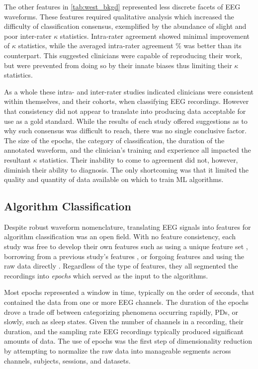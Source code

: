 The other features in \cref{tab:west_bkgd} represented less discrete facets of \ac{EEG} waveforms. These features required qualitative analysis which increased the difficulty of classification consensus, exemplified by the abundance of slight and poor inter-rater $\kappa$ statistics. Intra-rater agreement showed minimal improvement of $\kappa$ statistics, while the averaged intra-rater agreement \% was better than its counterpart. This suggested clinicians were capable of reproducing their work, but were prevented from doing so by their innate biases thus limiting their $\kappa$ statistics. 

As a whole these intra- and inter-rater studies indicated clinicians were consistent within themselves, and their cohorts, when classifying \ac{EEG} recordings. However that consistency did not appear to translate into producing data acceptable for use as a gold standard. While the results of each study offered suggestions as to why such consensus was difficult to reach, there was no single conclusive factor. The size of the epochs, the category of classification, the duration of the annotated waveform, and the clinician's training and experience all impacted the resultant $\kappa$ statistics. Their inability to come to agreement did not, however, diminish their ability to diagnosis. The only shortcoming was that it limited the quality and quantity of data available on which to train \ac{ML} algorithms.

\subsection{Algorithm Classification}

Despite robust waveform nomenclature, translating \ac{EEG} signals into features for algorithm classification was an open field. With no feature consistency, each study was free to develop their own features such as using a unique feature set \cite{Wulsin2011}, borrowing from a previous study's features \cite{Page2014}, or forgoing features and using the raw data directly \cite{Gandhi2014}. Regardless of the type of features, they all segmented the recordings into \emph{epochs} which served as the input to the algorithms.

Most epochs represented a window in time, typically on the order of seconds, that contained the data from one or more \ac{EEG} channels. The duration of the epochs drove a trade off between categorizing phenomena occurring rapidly, \acp{PD}, or slowly, such as sleep states. Given the number of channels in a recording, their duration, and the sampling rate \ac{EEG} recordings typically produced significant amounts of data. The use of epochs was the first step of dimensionality reduction by attempting to normalize the raw data into manageable segments across channels, subjects, sessions, and datasets.

